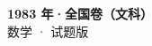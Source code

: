 \documentclass[zihao=-4, a4paper]{ctexart}
\begin{document}
\begin{center}
  {\Large\bfseries 1983 年·全国卷（文科）}\\[4pt]
  {\large 数学 · 试题版}
\end{center}
\medskip
{}

\end{document}
